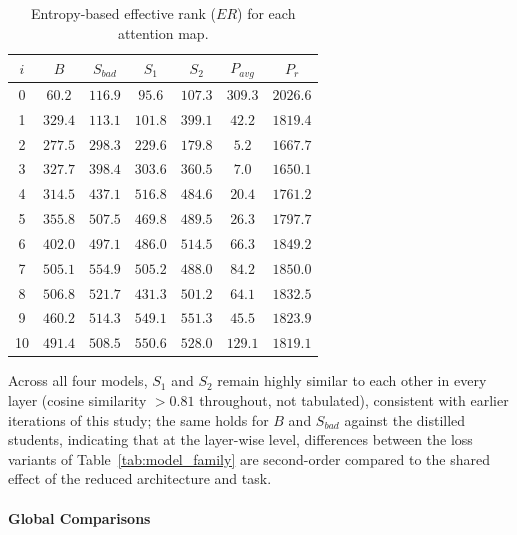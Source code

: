 \documentclass[conference]{IEEEtran}
\begin{document}
\begin{table}[h!]
\centering
\caption{Entropy-based effective rank ($ER$) for each attention map.}
\small
    \begin{tabular}{|c|c|c|c|c|c|c|}
        \hline
        $i$ & $B$ & $S_{bad}$ & $S_1$ & $S_2$ & $P_{avg}$ & $P_r$ \\
        \hline
        0 & $60.2$ & $116.9$ & $95.6$ & $107.3$ & $309.3$ & $2026.6$ \\
        1 & $329.4$ & $113.1$ & $101.8$ & $399.1$ & $42.2$ & $1819.4$ \\
        2 & $277.5$ & $298.3$ & $229.6$ & $179.8$ & $5.2$ & $1667.7$ \\
        3 & $327.7$ & $398.4$ & $303.6$ & $360.5$ & $7.0$ & $1650.1$ \\
        4 & $314.5$ & $437.1$ & $516.8$ & $484.6$ & $20.4$ & $1761.2$ \\
        5 & $355.8$ & $507.5$ & $469.8$ & $489.5$ & $26.3$ & $1797.7$ \\
        6 & $402.0$ & $497.1$ & $486.0$ & $514.5$ & $66.3$ & $1849.2$ \\
        7 & $505.1$ & $554.9$ & $505.2$ & $488.0$ & $84.2$ & $1850.0$ \\
        8 & $506.8$ & $521.7$ & $431.3$ & $501.2$ & $64.1$ & $1832.5$ \\
        9 & $460.2$ & $514.3$ & $549.1$ & $551.3$ & $45.5$ & $1823.9$ \\
        10 & $491.4$ & $508.5$ & $550.6$ & $528.0$ & $129.1$ & $1819.1$ \\
        \hline
    \end{tabular}
    \label{tab:imdb_er}
\end{table}

Across all four models, $S_1$ and $S_2$ remain highly similar to each other in every layer (cosine similarity $>0.81$ throughout, not tabulated), consistent with earlier iterations of this study; the same holds for $B$ and $S_{bad}$ against the distilled students, indicating that at the layer-wise level, differences between the loss variants of Table~\ref{tab:model_family} are second-order compared to the shared effect of the reduced architecture and task.

\paragraph{Global Comparisons}
\end{document}

